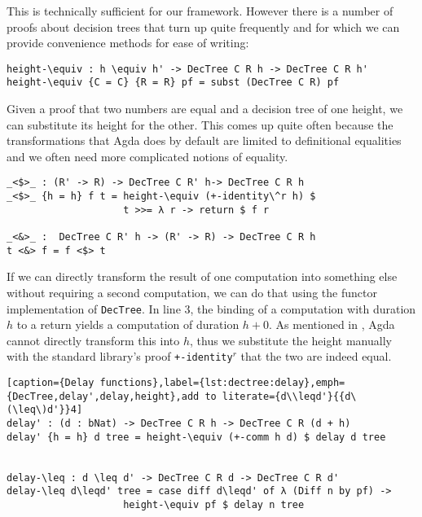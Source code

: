 This is technically sufficient for our framework. However there is a number of proofs about decision trees that turn up quite frequently and for which we can provide convenience methods for ease of writing:

\noindent\begin{minipage}{\linewidth}
\begin{lstlisting}[caption={Height substitution},label={lst:dectree:height-equiv},emph={height,DecTree}]
height-\equiv : h \equiv h' -> DecTree C R h -> DecTree C R h'
height-\equiv {C = C} {R = R} pf = subst (DecTree C R) pf
\end{lstlisting}
\end{minipage}

Given a proof that two numbers are equal and a decision tree of one height, we can substitute its height for the other. This comes up quite often because the transformations that Agda does by default are limited to definitional equalities and we often need more complicated notions of equality.

\begin{lstlisting}[caption={Functor implementation for DecTree},label={lst:dectree:functor},emph={DecTree,return,height}]
_<$>_ : (R' -> R) -> DecTree C R' h-> DecTree C R h
_<$>_ {h = h} f t = height-\equiv (+-identity\^r h) $
                    t >>= λ r -> return $ f r

_<&>_ :  DecTree C R' h -> (R' -> R) -> DecTree C R h
t <&> f = f <$> t
\end{lstlisting}

If we can directly transform the result of one computation into something else without requiring a second computation, we can do that using the functor implementation of \texttt{DecTree}. In line 3, the binding of a computation with duration $h$ to a return yields a computation of duration $h + 0$. As mentioned in \label{sec:tutorial:equality}, Agda cannot directly transform this into $h$, thus we substitute the height manually with the standard library's proof \texttt{+-identity$^r$} that the two are indeed equal.

\begin{lstlisting}[caption={Delay functions},label={lst:dectree:delay},emph={DecTree,delay',delay,height},add to literate={d\\leqd'}{{d\(\leq\)d'}}4]
delay' : (d : bNat) -> DecTree C R h -> DecTree C R (d + h)
delay' {h = h} d tree = height-\equiv (+-comm h d) $ delay d tree


delay-\leq : d \leq d' -> DecTree C R d -> DecTree C R d'
delay-\leq d\leqd' tree = case diff d\leqd' of λ (Diff n by pf) ->
                    height-\equiv pf $ delay n tree
\end{lstlisting}

